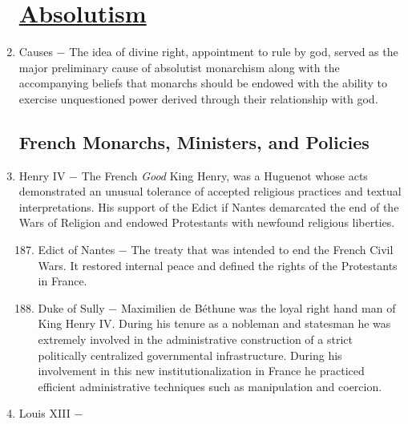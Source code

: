 \documentclass[12pt]{article}
\begin{document}
\begin{enumerate}
\section{\underline{Absolutism}}

\item Causes $-$ The idea of divine right, appointment to rule by god, served as the major preliminary cause of absolutist monarchism along with the accompanying beliefs that monarchs should be endowed with the ability to exercise unquestioned power derived through their relationship with god.

\subsection{French Monarchs, Ministers, and Policies}

\item Henry IV $-$ The French \textit{Good} King Henry, was a Huguenot whose acts demonstrated an unusual tolerance of accepted religious practices and textual interpretations. His support of the Edict if Nantes demarcated the end of the Wars of Religion and endowed Protestants with newfound religious liberties.

\begin{enumerate}[label=\arabic{*}.]
\setcounter{enumii}{186}

\item Edict of Nantes $-$ The treaty that was intended to end the French Civil Wars. It restored internal peace and defined the rights of the Protestants in France. %

\item Duke of Sully $-$ Maximilien de B\'ethune was the loyal right hand man of King Henry IV. During his tenure as a nobleman and statesman he was extremely involved in the administrative construction of a strict politically centralized governmental infrastructure. During his involvement in this new institutionalization in France he practiced efficient administrative techniques such as manipulation and coercion. 

\end{enumerate} 
\setcounter{enumi}{188}

\item Louis XIII $-$

\begin{enumerate}[label=\arabic{*}.]
\setcounter{enumii}{189}


\end{enumerate}
\end{enumerate}
\end{document}
